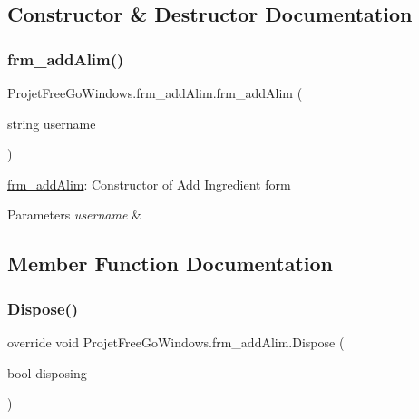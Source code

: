 \subsection{Constructor \& Destructor Documentation}
\mbox{\label{class_projet_free_go_windows_1_1frm__add_alim_a5fe0d7f0ad6caf2023d5563de536cf2f}} 
\subsubsection{\texorpdfstring{frm\+\_\+add\+Alim()}{frm\_addAlim()}}
{\footnotesize\ttfamily Projet\+Free\+Go\+Windows.\+frm\+\_\+add\+Alim.\+frm\+\_\+add\+Alim (\begin{DoxyParamCaption}\item[{string}]{username }\end{DoxyParamCaption})}



\hyperlink{class_projet_free_go_windows_1_1frm__add_alim}{frm\+\_\+add\+Alim}\+: Constructor of Add Ingredient form 


\begin{DoxyParams}{Parameters}
{\em username} & \\
\hline
\end{DoxyParams}


\subsection{Member Function Documentation}
\mbox{\label{class_projet_free_go_windows_1_1frm__add_alim_aeeea9f3518264026c7e94b37bbc07484}} 
\subsubsection{\texorpdfstring{Dispose()}{Dispose()}}
{\footnotesize\ttfamily override void Projet\+Free\+Go\+Windows.\+frm\+\_\+add\+Alim.\+Dispose (\begin{DoxyParamCaption}\item[{bool}]{disposing }\end{DoxyParamCaption})\hspace{0.3cm}{\ttfamily [protected]}}



